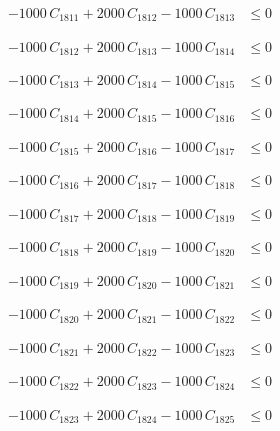 \documentclass[a4paper,11pt]{article}
\begin{document}
\begin{align}
-1000\,C_{1811} + 2000\,C_{1812} - 1000\,C_{1813} &\leq 0 \nonumber
\end{align}

\begin{align}
-1000\,C_{1812} + 2000\,C_{1813} - 1000\,C_{1814} &\leq 0 \nonumber
\end{align}

\begin{align}
-1000\,C_{1813} + 2000\,C_{1814} - 1000\,C_{1815} &\leq 0 \nonumber
\end{align}

\begin{align}
-1000\,C_{1814} + 2000\,C_{1815} - 1000\,C_{1816} &\leq 0 \nonumber
\end{align}

\begin{align}
-1000\,C_{1815} + 2000\,C_{1816} - 1000\,C_{1817} &\leq 0 \nonumber
\end{align}

\begin{align}
-1000\,C_{1816} + 2000\,C_{1817} - 1000\,C_{1818} &\leq 0 \nonumber
\end{align}

\begin{align}
-1000\,C_{1817} + 2000\,C_{1818} - 1000\,C_{1819} &\leq 0 \nonumber
\end{align}

\begin{align}
-1000\,C_{1818} + 2000\,C_{1819} - 1000\,C_{1820} &\leq 0 \nonumber
\end{align}

\begin{align}
-1000\,C_{1819} + 2000\,C_{1820} - 1000\,C_{1821} &\leq 0 \nonumber
\end{align}

\begin{align}
-1000\,C_{1820} + 2000\,C_{1821} - 1000\,C_{1822} &\leq 0 \nonumber
\end{align}

\begin{align}
-1000\,C_{1821} + 2000\,C_{1822} - 1000\,C_{1823} &\leq 0 \nonumber
\end{align}

\begin{align}
-1000\,C_{1822} + 2000\,C_{1823} - 1000\,C_{1824} &\leq 0 \nonumber
\end{align}

\begin{align}
-1000\,C_{1823} + 2000\,C_{1824} - 1000\,C_{1825} &\leq 0 \nonumber
\end{align}
\end{document}
